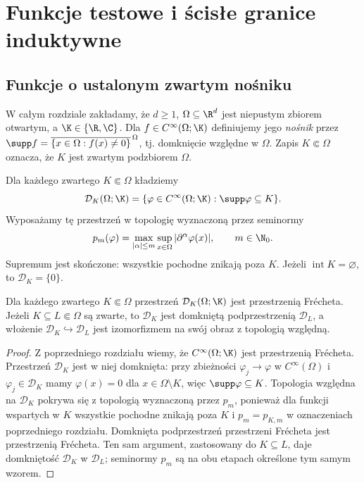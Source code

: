 \setcounter{section}{17}
\section{Funkcje testowe i ścisłe granice induktywne}
\label{sec:funkcje-testowe18}

\subsection{Funkcje o ustalonym zwartym nośniku}

W całym rozdziale zakładamy, że $d\ge1$, $\Omega\subseteq\R^d$
jest niepustym zbiorem otwartym, a $\K\in\{\R,\C\}$.
Dla $f\in C^\infty(\Omega;\K)$ definiujemy jego \emph{nośnik}
przez $\supp f=\overline{\{x\in\Omega:f(x)\ne0\}}^{\,\Omega}$,
tj. domknięcie względne w $\Omega$. Zapis $K\Subset\Omega$
oznacza, że $K$ jest zwartym podzbiorem $\Omega$.

\begin{definicja}
\label{def:DK18}
Dla każdego zwartego $K\Subset\Omega$ kładziemy
\[
 \mathcal D_K(\Omega;\K)=\{\varphi\in C^\infty(\Omega;\K):
 \supp\varphi\subseteq K\}.
\]
Wyposażamy tę przestrzeń w topologię wyznaczoną przez seminormy
\[p_m(\varphi)=\max_{|\alpha|\le m}\sup_{x\in\Omega}
|\partial^\alpha\varphi(x)|,\qquad m\in\N_0.\]
Supremum jest skończone: wszystkie pochodne znikają poza $K$.
Jeżeli $\operatorname{int}K=\varnothing$, to $\mathcal D_K=\{0\}$.
\end{definicja}

\begin{twierdzenie}
\label{thm:DK-frechet18}
Dla każdego zwartego $K\Subset\Omega$ przestrzeń
$\mathcal D_K(\Omega;\K)$ jest przestrzenią Fr\'echeta.
Jeżeli $K\subseteq L\Subset\Omega$ są zwarte, to
$\mathcal D_K$ jest domkniętą podprzestrzenią $\mathcal D_L$,
a włożenie $\mathcal D_K\hookrightarrow\mathcal D_L$
jest izomorfizmem na swój obraz z topologią względną.
\end{twierdzenie}
\begin{proof}
Z poprzedniego rozdziału wiemy, że
$C^\infty(\Omega;\K)$ jest przestrzenią Fr\'echeta.
Przestrzeń $\mathcal D_K$ jest w niej domknięta:
przy zbieżności $\varphi_j\to\varphi$ w $C^\infty(\Omega)$
i $\varphi_j\in\mathcal D_K$ mamy $\varphi(x)=0$ dla
$x\in\Omega\setminus K$, więc $\supp\varphi\subseteq K$.
Topologia względna na $\mathcal D_K$ pokrywa się z topologią
wyznaczoną przez $p_m$, ponieważ dla funkcji wspartych w $K$
wszystkie pochodne znikają poza $K$ i $p_m=p_{K,m}$
w oznaczeniach poprzedniego rozdziału.
Domknięta podprzestrzeń przestrzeni Fr\'echeta jest przestrzenią
Fr\'echeta. Ten sam argument, zastosowany do $K\subseteq L$,
daje domkniętość $\mathcal D_K$ w $\mathcal D_L$;
seminormy $p_m$ są na obu etapach określone tym samym wzorem.
\end{proof}

